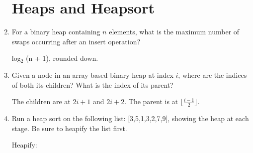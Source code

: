 \documentclass[11pt]{article}
\newenvironment{answer}{\large\lstset{basicstyle=\tiny\ttfamily}\color{white}}{}
\newenvironment{answer}{\large\lstset{basicstyle=\large\ttfamily}\color{red}}{}
\begin{document}
\begin{enumerate}
\section*{Heaps and Heapsort}

\item For a binary heap containing $n$ elements, what is the maximum number of
      swaps occurring after an insert operation?

    \begin{answer}
        log$_{\textrm{2}}$ (n + 1), rounded down.
    \end{answer}

\item Given a node in an array-based binary heap at index $i$, where are the
      indices of both its children? What is the index of its parent?

    \begin{answer}
    The children are at $2i+1$ and $2i+2$. The parent is at
    $\lfloor\frac{i-1}{2}\rfloor$.

    \end{answer}

\item Run a heap sort on the following list: [3,5,1,3,2,7,9], showing the heap
      at each stage. Be sure to heapify the list first.

    \begin{answer}
        Heapify:  \newline
        	[\underline{3}, 5, 1, 3, 2, 7, 9]       \newline 
    	

\end{answer}
\end{enumerate}
\end{document}
